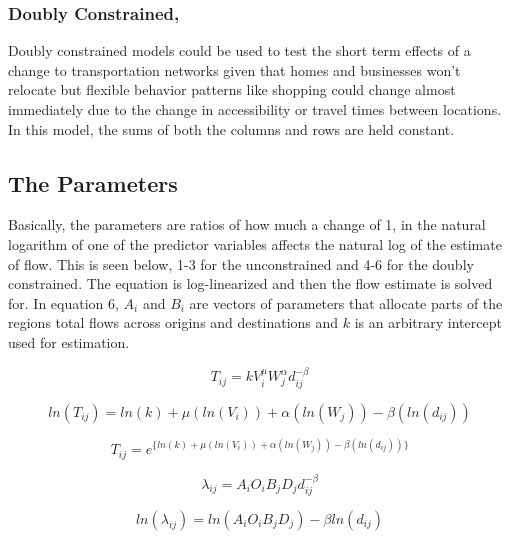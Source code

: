 \documentclass[11pt]{article} %
\begin{document}
\subsubsection{Doubly Constrained,}

Doubly constrained models could be used to test the short term effects of a change to transportation networks given that homes and businesses won't relocate but flexible behavior patterns like shopping could change almost immediately due to the change in accessibility or travel times between locations. In this model, the sums of both the columns and rows are held constant.

\subsection{The Parameters}

Basically, the parameters are ratios of how much a change of 1, in the natural logarithm of one of the predictor variables affects the natural log of the estimate of flow. This is seen below, 1-3 for the unconstrained and 4-6 for the doubly constrained. The equation is log-linearized and then the flow estimate is solved for. In equation 6, $A_i$ and $B_i$ are vectors of parameters that allocate parts of the regions total flows across origins and destinations and $k$ is an arbitrary intercept used for estimation. 

\begin{equation}
T_{ij} = k V_i ^{\mu} W_j^{\alpha} d_{ij}^{-\beta}
\end{equation}

\begin{equation}
ln(T_{ij}) = ln(k) + \mu (ln(V_i)) +  \alpha( ln(W_j)) - \beta (ln(d_{ij}))
\end{equation}




\begin{equation}
T_{ij} = e^ { \{ ln(k) + \mu (ln(V_i)) +  \alpha( ln(W_j)) - \beta (ln(d_{ij})) \}}
\end{equation}


\begin{equation}
\lambda_{ij} = A_i O_i  B_j D_j d_{ij}^{-\beta}
\end{equation}

\begin{equation}
ln(\lambda_{ij}) = ln(A_i O_i  B_j D_j) - \beta ln( d_{ij})
\end{equation}
\end{document}
